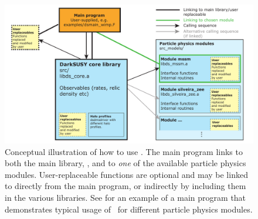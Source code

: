 \begin{figure}[t!]
\centering
\includegraphics[width=\textwidth]{fig/ds6-structure-v6}
\vspace{-0.5cm}
\caption{Conceptual illustration of how to use \ds. The main program links
to both  the main library, , and to \emph{one} of the available particle 
physics modules. User-replaceable functions are optional and may be linked to directly 
from the main program, or indirectly by including them in the various libraries. 
See  for an example of a main program that demonstrates
typical usage of \ds\ for different particle physics modules.}
\label{fig:concept}
\end{figure}


